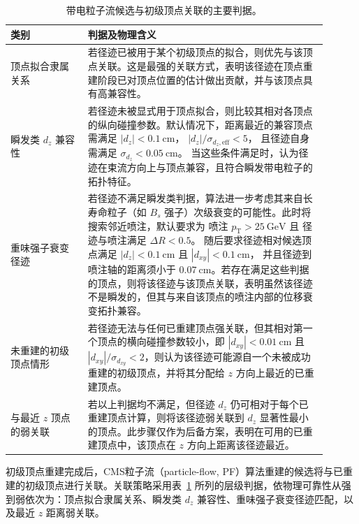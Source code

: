 \begin{table}
  \centering
  \begin{threeparttable}[c]
    \caption{带电粒子流候选与初级顶点关联的主要判据。}
    \label{tab:pv-association}
    \begin{tabular}{p{0.22\linewidth}p{0.68\linewidth}}
      \toprule
      类别 & 判据及物理含义 \\
      \midrule
      顶点拟合隶属关系 &
      若径迹已被用于某个初级顶点的拟合，则优先与该顶点关联。这是最强的关联方式，表明该径迹在顶点重建阶段已对顶点位置的估计做出贡献，并与该顶点具有高兼容性。
      \\
      瞬发类 $d_z$ 兼容性
      &
      若径迹未被显式用于顶点拟合，则比较其相对各顶点的纵向碰撞参数。默认情况下，距离最近的兼容顶点需满足
      $|d_z| < \SI{0.1}{\centi\meter}$，
      $|d_z|/\sigma_{d_z,\mathrm{eff}} < 5$，
      且径迹自身需满足 $\sigma_{d_z}<\SI{0.05}{\centi\meter}$。
      当这些条件满足时，认为径迹在束流方向上与顶点兼容，且符合瞬发带电粒子的拓扑特征。
      \\
      重味强子衰变径迹
      &
      若径迹不满足瞬发类判据，算法进一步考虑其来自长寿命粒子（如 $B_s$ 强子）次级衰变的可能性。此时将搜索邻近喷注，默认要求为
      喷注 $p_{\mathrm T}>\SI{25}{\giga\eV}$ 且
      径迹与喷注满足 $\Delta R<0.5$。
      随后要求径迹相对候选顶点满足
      $|d_z|<\SI{0.1}{\centi\meter}$ 且 $|d_{xy}|<\SI{0.1}{\centi\meter}$，
      并且径迹到喷注轴的距离须小于 $\SI{0.07}{\centi\meter}$。若存在满足这些判据的顶点，则将该径迹与该顶点关联，表明虽然该径迹不是瞬发的，但其与来自该顶点的喷注内部的位移衰变拓扑兼容。
      \\
      未重建的初级顶点情形
      &
      若径迹无法与任何已重建顶点强关联，但其相对第一个顶点的横向碰撞参数较小，即 $|d_{xy}|<\SI{0.01}{\centi\meter}$ 且 $|d_{xy}|/\sigma_{d_{xy}}<2$，则认为该径迹可能源自一个未被成功重建的初级顶点，并将其分配给 $z$ 方向上最近的已重建顶点。
      \\
      与最近 $z$ 顶点的弱关联
      &
      若以上判据均不满足，但径迹 $d_z$ 仍可相对于每个已重建顶点计算，则将该径迹弱关联到 $d_z$ 显著性最小的顶点。此步骤仅作为后备方案，表明在可用的已重建顶点中，该顶点在 $z$ 方向上距离该径迹最近。
      \\
      \bottomrule
    \end{tabular}
  \end{threeparttable}
\end{table}

初级顶点重建完成后，CMS粒子流（particle-flow, PF）算法重建的候选将与已重建的初级顶点进行关联。关联策略采用表~\ref{tab:pv-association} 所列的层级判据，依物理可靠性从强到弱依次为：顶点拟合隶属关系、瞬发类 $d_z$ 兼容性、重味强子衰变径迹匹配，以及最近 $z$ 距离弱关联。


